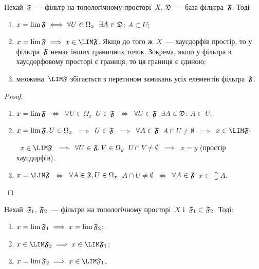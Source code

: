 \begin{theorem}
    \label{th:filterbase-limits-limitpoitns}
    Нехай~$\frak F$~--- фільтр на топологічному просторі~$X$, $\frak D$~--- %
    база фільтра~$\frak F$. Тоді
    \begin{enumerate}
        \item $x = \lim \frak F \iff \forall U \in \Omega_x$~$\exists A \in \frak D$: $A \subset U$;
        
        \item $x = \lim \frak F \implies x \in \LIM \frak F$. Якщо до того ж~$X$~--- хаусдорфів простір, то у фільтра~$\frak F$ немає інших граничних точок. Зокрема, якщо у фільтра в хаусдорфовому просторі є границя, то ця границя є єдиною;
        
        \item множина~$\LIM \frak F$ збігається з перетином замикань усіх елементів фільтра~$\frak F$.
    \end{enumerate}
\end{theorem}

\begin{proof}
    \listhack
    \begin{enumerate}
        \item $x = \lim \frak F$~$\iff$~$\forall U \in \Omega_x$~$U \in \frak F$~$\iff$~$\forall U \in \frak F$~$\exists A \in \frak D$: $A \subset U$.

        \item $x = \lim \frak F, U \in \Omega_x$~$\implies$~$U \in \frak F$~$\implies$~$\forall A \in \frak F$~$A \cap U \ne \emptyset$~$\implies$~$x \in \LIM \frak F$;
        
       ~$x \in \LIM \frak F$~$\implies$~$\forall U \in \frak F, V \in \Omega_y$~$U \cap V \ne \emptyset$~$\implies$~$x = y$ (простір хаусдорфів).

        \item $x = \LIM \frak F$~$\iff$~$\forall A \in \frak F, U \in \Omega_x$~$A \cap U \ne \emptyset$~$\iff$~$\forall A \in \frak F$~$x \in \closure A$. \qedhere
    \end{enumerate}
\end{proof}

\begin{theorem}
    \label{th:filters-limits-limitpoitns}
    Нехай~$\frak F_1$, $\frak F_2$~--- фільтри на топологічному просторі~$X$ і~$\frak F_1 \subset \frak F_2$. Тоді:
    \begin{enumerate}
        \item $x = \lim \frak F_1 \implies x = \lim \frak F_2$;
        \item $x \in \LIM \frak F_2 \implies x \in \LIM \frak F_1$;
        \item $x = \lim \frak F_2 \implies x \in \LIM \frak F_1$.
    \end{enumerate}
\end{theorem}

